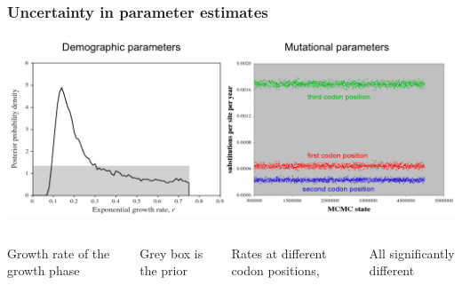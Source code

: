 \begin{frame}
\frametitle{Uncertainty in parameter estimates}

\includegraphics[width=\textwidth]{../../images/UncertaintyParameter}

\footnotesize{
\begin{columns}[t]


Growth rate of the growth phase

Grey box is the prior


Rates at different codon positions,

All significantly different

\end{columns}
}

\end{frame}
